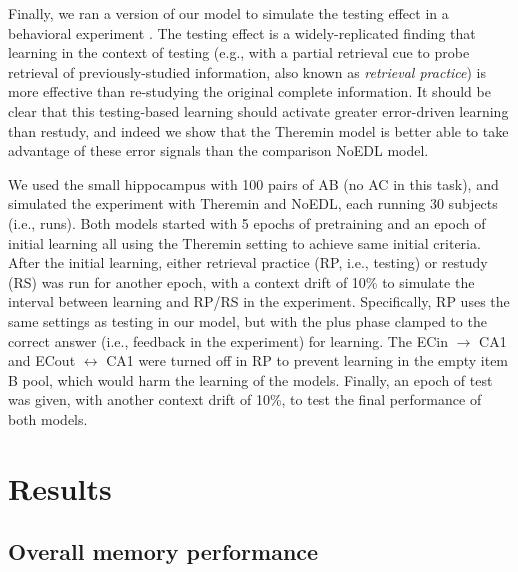 \documentclass[11pt,twoside]{article}
\newif\myifpdf
\begin{document}
Finally, we ran a version of our model to simulate the testing effect in a behavioral experiment \citep{CarrierPashler92}.  The testing effect is a widely-replicated finding that learning in the context of testing (e.g., with a partial retrieval cue to probe retrieval of previously-studied information, also known as \emph{retrieval practice}) is more effective than re-studying the original complete information.  It should be clear that this testing-based learning should activate greater error-driven learning than restudy, and indeed we show that the Theremin model is better able to take advantage of these error signals than the comparison NoEDL model.

We used the small hippocampus with 100 pairs of AB (no AC in this task), and simulated the experiment with Theremin and NoEDL, each running 30 subjects (i.e., runs).  Both models started with 5 epochs of pretraining and an epoch of initial learning all using the Theremin setting to achieve same initial criteria.  After the initial learning, either retrieval practice (RP, i.e., testing) or restudy (RS) was run for another epoch, with a context drift of 10\% to simulate the interval between learning and RP/RS in the experiment. Specifically, RP uses the same settings as testing in our model, but with the plus phase clamped to the correct answer (i.e., feedback in the experiment) for learning.  The ECin $\rightarrow$ CA1 and ECout $\leftrightarrow$ CA1 were turned off in RP to prevent learning in the empty item B pool, which would harm the learning of the models.  Finally, an epoch of test was given, with another context drift of 10\%, to test the final performance of both models. 

\section{Results}

\subsection{Overall memory performance}
\end{document}
